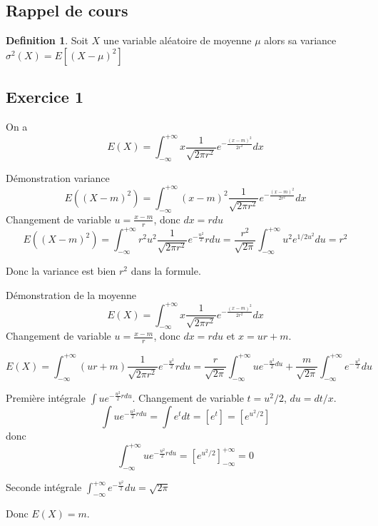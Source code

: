 \documentclass[]{book}
\theoremstyle{definition}
\newtheorem{defn}{Definition}
\begin{document}
\subsection*{Rappel de cours}
\begin{defn}
Soit $X$ une variable al\'eatoire de moyenne $\mu$ alors sa variance $\sigma^2(X) = E[(X-\mu)^2]$
\end{defn}



\newpage
\subsection*{Exercice 1}
On a 
$$
E(X) = \int_{-\infty}^{+\infty}{x \frac{1}{\sqrt{2\pi r^2}} e^{-\frac{(x-m)^2}{2r^2}} dx}
$$

D\'emonstration variance
$$
E((X-m)^2) = \int_{-\infty}^{+\infty}{(x-m)^2\frac{1}{\sqrt{2\pi r^2}} e^{-\frac{(x-m)^2}{2r^2}} dx}
$$
Changement de variable $u = \frac{x-m}{r}$, donc $dx = rdu$
$$
E((X-m)^2) = \int_{-\infty}^{+\infty}{r^2u^2\frac{1}{\sqrt{2\pi r^2}} e^{-\frac{u^2}{2}} r du} =
\frac{r^2}{\sqrt{2\pi}}\int_{-\infty}^{+\infty}{u^2 e^{1/2u^2}du} = r^2
$$

Donc la variance est bien $r^2$ dans la formule.

D\'emonstration de la moyenne
$$
E(X) = \int_{-\infty}^{+\infty}{x \frac{1}{\sqrt{2\pi r^2}} e^{-\frac{(x-m)^2}{2r^2}} dx}
$$
Changement de variable $u = \frac{x-m}{r}$, donc $dx = rdu$ et $x=ur+m$.

$$
E(X) = \int_{-\infty}^{+\infty}{(ur+m) \frac{1}{\sqrt{2\pi r^2}} e^{-\frac{u^2}{2}} rdu} = 
\frac{r}{\sqrt{2\pi}} \int_{-\infty}^{+\infty}{u e^{-\frac{u^2}{2} du}}  + \frac{m}{\sqrt{2\pi}} \int_{-\infty}^{+\infty}{e^{-\frac{u^2}{2}} du}
$$

Premi\`ere int\'egrale $\int{u e^{-\frac{u^2}{2} rdu}}$. Changement de variable $t = u^2/2$, $du = dt/x$.
$$
\int{u e^{-\frac{u^2}{2} rdu}} = \int{e^t dt} = [e^t] = [e^{u^2/2}]
$$
donc
$$
\int_{-\infty}^{+\infty}{u e^{-\frac{u^2}{2} rdu}} = [e^{u^2/2}]_{-\infty}^{+\infty} = 0
$$

Seconde int\'egrale $\int_{-\infty}^{+\infty}{e^{-\frac{u^2}{2}} du} = \sqrt{2\pi}$

Donc $E(X) = m$.
\end{document}
